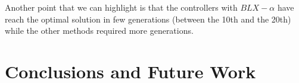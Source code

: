\documentclass[10pt,journal,compsoc]{IEEEtran}
\begin{document}
Another point that we can highlight is that the controllers with
$BLX-\alpha$ have reach the optimal solution in few generations
(between the 10th and the 20th) while the other methods required more
generations. 


\section{Conclusions and Future Work} 
\label{sec:conclusions}






\end{document}
